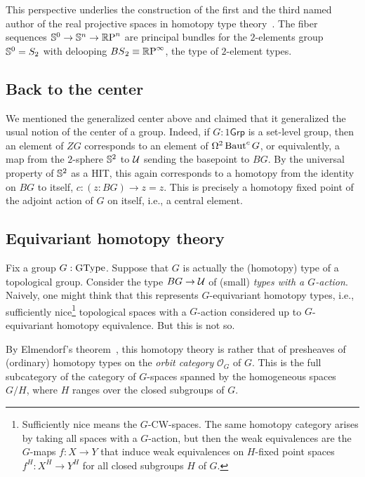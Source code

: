 This perspective underlies the construction of the first and the third
named author of the real projective spaces in homotopy type
theory~\cite{realprojective}. The fiber sequences ${\mathbb{S}}^0 \to {\mathbb{S}}^n \to
{\mathbb{R}\mathrm{P}}^n$ are principal bundles for the $2$-elements group
${\mathbb{S}}^0=S_2$ with delooping $\mathop{BS}_2\equiv {\mathbb{R}\mathrm{P}}^\infty$,
the type of $2$-element types.

\subsection{Back to the center}
\label{sec:center}

We mentioned the generalized center above and claimed that it
generalized the usual notion of the center of a group.
Indeed, if $G:1\mathsf{Grp}$ is a set-level group, then an element of
$ZG$ corresponds to an element of $\Omega^2\operatorname{Baut}^cG$, or equivalently,
a map from the $2$-sphere ${\mathbb{S}}^2$ to $\mathcal{U}$
sending the basepoint to $BG$.
By the universal property of
${\mathbb{S}}^2$ as a HIT, this again corresponds to a homotopy from the
identity on $BG$ to itself, $c : (z : BG) \to z = z$.
This is precisely a homotopy fixed point of the adjoint action of
$G$ on itself, i.e., a central element.

\subsection{Equivariant homotopy theory}
\label{sec:equivariant}

Fix a group $G : \mathrm{GType}$. Suppose that $G$ is actually the (homotopy)
type of a topological group. Consider the
type $BG \to \mathcal{U}$ of (small) \emph{types with a $G$-action}. Naively,
one might think that this represents $G$-equivariant homotopy types,
i.e., sufficiently nice\footnote{Sufficiently nice means the
  $G$-CW-spaces. The same homotopy category arises by taking all
  spaces with a $G$-action, but then the weak equivalences are the
  $G$-maps $f : X \to Y$ that induce weak equivalences on $H$-fixed
  point spaces $f^H : X^H \to Y^H$ for all closed subgroups $H$ of $G$.}
topological spaces with a $G$-action considered up to $G$-equivariant
homotopy equivalence. But this is not so.

By Elmendorf's theorem~\cite{Elmendorf1983}, this homotopy theory is
rather that of presheaves of (ordinary) homotopy types on the
\emph{orbit category} $\mathcal{O}_G$ of $G$. This is the full
subcategory of the category of $G$-spaces spanned by the homogeneous
spaces $G/H$, where $H$ ranges over the closed subgroups of $G$.

